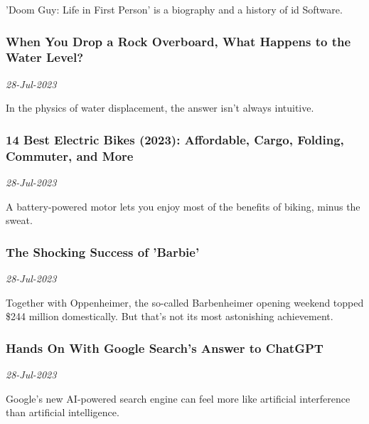 'Doom Guy: Life in First Person' is a biography and a history of id Software.
\subsubsection{When You Drop a Rock Overboard, What Happens to the Water Level? \href{https://www.wired.com/story/when-you-drop-a-rock-overboard-what-happens-to-the-water-level/}{}}
\textit{28-Jul-2023}

In the physics of water displacement, the answer isn’t always intuitive.
\subsubsection{14 Best Electric Bikes (2023): Affordable, Cargo, Folding, Commuter, and More \href{https://www.wired.com/gallery/best-electric-bikes/}{}}
\textit{28-Jul-2023}

A battery-powered motor lets you enjoy most of the benefits of biking, minus the sweat.
\subsubsection{The Shocking Success of 'Barbie' \href{https://www.wired.com/story/barbie-box-office-oppenheimer/}{}}
\textit{28-Jul-2023}

Together with Oppenheimer, the so-called Barbenheimer opening weekend topped \$244 million domestically. But that’s not its most astonishing achievement.
\subsubsection{Hands On With Google Search’s Answer to ChatGPT \href{https://www.wired.com/story/plaintext-hands-on-with-google-searchs-answer-to-chatgpt/}{}}
\textit{28-Jul-2023}

Google’s new AI-powered search engine can feel more like artificial interference than artificial intelligence.
